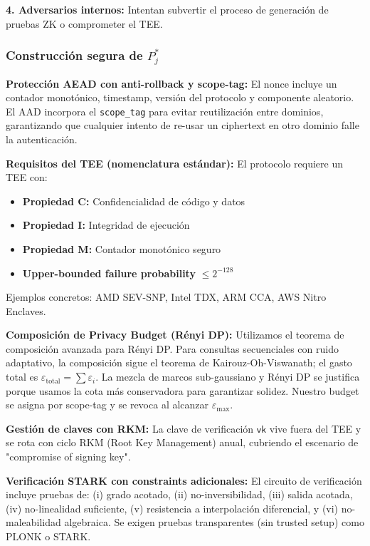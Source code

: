 \documentclass[11pt]{article}
\theoremstyle{plain}
\begin{document}
\textbf{4. Adversarios internos:} Intentan subvertir el proceso de generación de pruebas ZK o comprometer el TEE.

\subsubsection{Construcción segura de $P^*_j$}

\textbf{Protección AEAD con anti-rollback y scope-tag:}
El nonce incluye un contador monotónico, timestamp, versión del protocolo y componente aleatorio. El AAD incorpora el \texttt{scope\_tag} para evitar reutilización entre dominios, garantizando que cualquier intento de re-usar un ciphertext en otro dominio falle la autenticación.

\textbf{Requisitos del TEE (nomenclatura estándar):}
El protocolo requiere un TEE con:
\begin{itemize}
    \item \textbf{Propiedad C:} Confidencialidad de código y datos
    \item \textbf{Propiedad I:} Integridad de ejecución
    \item \textbf{Propiedad M:} Contador monotónico seguro
    \item \textbf{Upper-bounded failure probability} $\leq 2^{-128}$
\end{itemize}

Ejemplos concretos: AMD SEV-SNP, Intel TDX, ARM CCA, AWS Nitro Enclaves.

\textbf{Composición de Privacy Budget (Rényi DP):}
Utilizamos el teorema de composición avanzada para Rényi DP. Para consultas secuenciales con ruido adaptativo, la composición sigue el teorema de Kairouz-Oh-Viswanath; el gasto total es $\varepsilon_{\text{total}} = \sum\varepsilon_i$. La mezcla de marcos sub-gaussiano y Rényi DP se justifica porque usamos la cota más conservadora para garantizar solidez. Nuestro budget se asigna por scope-tag y se revoca al alcanzar $\varepsilon_{\text{max}}$.

\textbf{Gestión de claves con RKM:}
La clave de verificación $\mathsf{vk}$ vive fuera del TEE y se rota con ciclo RKM (Root Key Management) anual, cubriendo el escenario de "compromise of signing key".

\textbf{Verificación STARK con constraints adicionales:}
El circuito de verificación incluye pruebas de: (i) grado acotado, (ii) no-inversibilidad, (iii) salida acotada, (iv) no-linealidad suficiente, (v) resistencia a interpolación diferencial, y (vi) no-maleabilidad algebraica. Se exigen pruebas transparentes (sin trusted setup) como PLONK o STARK.
\end{document}

